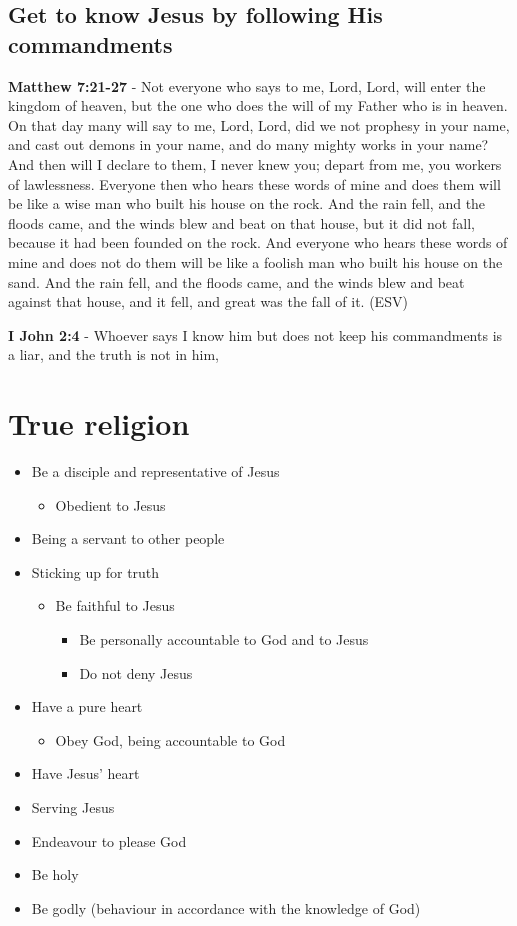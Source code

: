 \documentclass[11pt]{article}
\begin{document}
\subsection{Get to know Jesus by following His commandments}
\label{sec:org812fcd5}
\textbf{Matthew 7:21-27} - Not everyone who says to me, Lord, Lord, will enter the kingdom of heaven, but the one who does the will of my Father who is in heaven.  On that day many will say to me, Lord, Lord, did we not prophesy in your name, and cast out demons in your name, and do many mighty works in your name?  And then will I declare to them, I never knew you; depart from me, you workers of lawlessness.  Everyone then who hears these words of mine and does them will be like a wise man who built his house on the rock.  And the rain fell, and the floods came, and the winds blew and beat on that house, but it did not fall, because it had been founded on the rock.  And everyone who hears these words of mine and does not do them will be like a foolish man who built his house on the sand.  And the rain fell, and the floods came, and the winds blew and beat against that house, and it fell, and great was the fall of it. (ESV)

\textbf{I John 2:4} - Whoever says I know him but does not keep his commandments is a liar, and the truth is not in him,

\section{True religion}
\label{sec:orgf7a1c7a}
\begin{itemize}
\item Be a disciple and representative of Jesus
\begin{itemize}
\item Obedient to Jesus
\end{itemize}
\item Being a servant to other people
\item Sticking up for truth
\begin{itemize}
\item Be faithful to Jesus
\begin{itemize}
\item Be personally accountable to God and to Jesus
\item Do not deny Jesus
\end{itemize}
\end{itemize}
\item Have a pure heart
\begin{itemize}
\item Obey God, being accountable to God
\end{itemize}
\item Have Jesus' heart
\item Serving Jesus
\item Endeavour to please God
\item Be holy
\item Be godly (behaviour in accordance with the knowledge of God)
\end{itemize}
\end{document}
